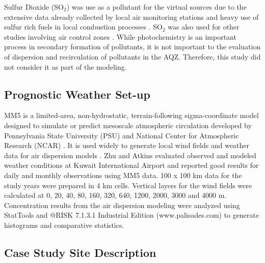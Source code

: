 Sulfur Dioxide (SO$_{2}$) was use as a pollutant for the virtual sources due to the extensive data already collected by local air monitoring stations and heavy use of sulfur rich fuels in local combustion processes \citep{Al-Awadhi2014, Al-Rashidi2005}.  SO$_{2}$ was also used for other studies involving air control zones \citep{Hao2000, Henschel2013, Pereira2007}.  While photochemistry is an important process in secondary formation of pollutants, it is not important to the evaluation of dispersion and recirculation of pollutants in the AQZ.  Therefore, this study did not consider it as part of the modeling. 

\subsection{Prognostic Weather Set-up}

MM5 is a limited-area, non-hydrostatic, terrain-following sigma-coordinate model designed to simulate or predict mesoscale atmospheric circulation developed by Pennsylvania State University (PSU) and National Center for Atmospheric Research (NCAR) \citep{Grell1994}.  It is used widely to generate local wind fields and weather data for air dispersion models \citep{Ghannam2013a, Lee2009, Tsai2011, Zhu2004}.  Zhu and Atkins evaluated observed and modeled weather conditions at Kuwait International Airport and reported good results for daily and monthly observations using MM5 data.  100 x 100 km data for the study years were prepared in 4 km cells. Vertical layers for the wind fields were calculated at 0, 20, 40, 80, 160, 320, 640, 1200, 2000, 3000 and 4000 m. Concentration results from the air dispersion modeling were analyzed using StatTools and @RISK 7.1.3.1 Industrial Edition (www.palisades.com) to generate histograms and comparative statistics. 

\subsection{Case Study Site Description}

